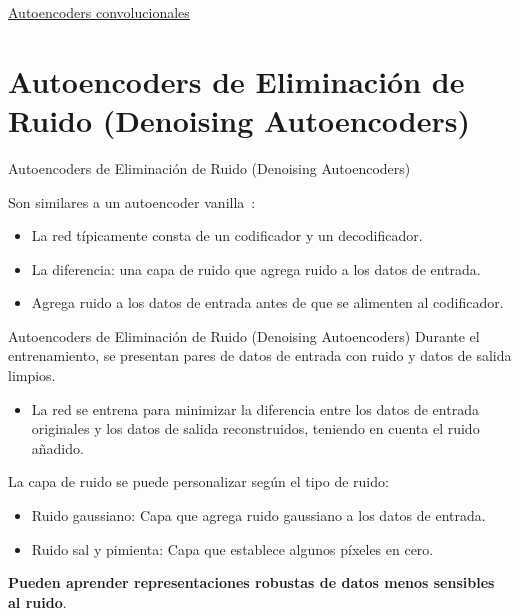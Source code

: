 \begin{exercise}
\href{https://colab.research.google.com/drive/1p1F4vTvJ0FNQ-sJEibo22bEx5inPbMyL}{Autoencoders convolucionales}

\end{exercise}


\section{Autoencoders de Eliminación de Ruido (Denoising Autoencoders)}

\begin{frame}{Autoencoders de Eliminación de Ruido (Denoising Autoencoders)}

Son similares a un autoencoder vanilla~\cite{vincent2008extracting}:

\begin{itemize}
    \item La red típicamente consta de un codificador y un decodificador.
    \item La diferencia: una capa de ruido que agrega ruido a los datos de entrada.
    \item Agrega ruido a los datos de entrada antes de que se alimenten al codificador.
\end{itemize}

\end{frame}


\begin{frame}{Autoencoders de Eliminación de Ruido (Denoising Autoencoders)}
Durante el entrenamiento, se presentan pares de datos de entrada con ruido y datos de salida limpios.

\begin{itemize}
    \item La red se entrena para minimizar la diferencia entre los datos de entrada originales y los datos de salida reconstruidos, teniendo en cuenta el ruido añadido.
\end{itemize}

La capa de ruido se puede personalizar según el tipo de ruido:

\begin{itemize}
    \item \eg Ruido gaussiano: Capa que agrega ruido gaussiano a los datos de entrada.
    \item \eg Ruido sal y pimienta: Capa que establece algunos píxeles en cero.
\end{itemize}

\textbf{Pueden aprender representaciones \alert{robustas} de datos \alert{menos sensibles al ruido}}.
\end{frame}

